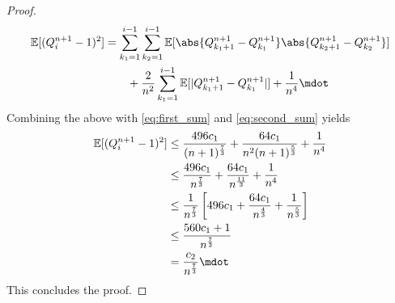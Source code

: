 \begin{lemma}
\begin{proof}
\begin{align*}
		\E[(Q_i^{n+1} - 1)^2] &= \sum_{k_1=1}^{i-1}\sum_{k_2=1}^{i-1}\E[\abs{Q_{k_1+1}^{n+1} - Q_{k_1}^{n+1}}\abs{Q_{k_2+1}^{n+1} - Q_{k_2}^{n+1}}]\\
		&\qquad + \frac{2}{n^2} \sum_{k_1=1}^{i-1}\E[|Q_{k_1+1}^{n+1} - Q_{k_1}^{n+1}|] + \frac{1}{n^4}\mdot
		\end{align*}
		Combining the above with \eqref{eq:first_sum} and \eqref{eq:second_sum} yields
		\begin{align*}
		\E[(Q_i^{n+1} - 1)^2] &\leq \frac{496c_1}{(n+1)^\frac{7}{3}}+ \frac{64c_1}{n^2(n+1)^\frac{5}{3}} + \frac{1}{n^4}\\
		&\leq \frac{496c_1}{n^\frac{7}{3}} + \frac{64c_1}{n^\frac{11}{3}} + \frac{1}{n^4}\\
		&\leq \frac{1}{n^\frac{7}{3}}\left[496c_1 + \frac{64c_1}{n^\frac{4}{3}} + \frac{1}{n^\frac{5}{3}}\right]\\
		&\leq \frac{560c_1+1}{n^\frac{7}{3}}\\
		&= \frac{c_2}{n^\frac{7}{3}}\mdot
		\end{align*}
		This concludes the proof.
	\end{proof}
\end{lemma}
%
%
%
